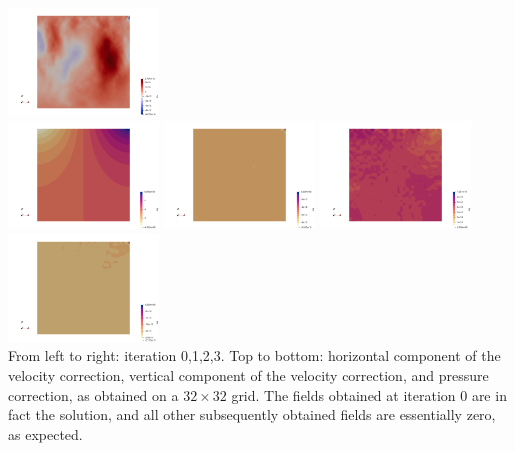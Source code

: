 \begin{center}
\includegraphics[width=4cm]{python_codes/fieldstone_87/results/experiment_00/dv_03}\\
\includegraphics[width=4cm]{python_codes/fieldstone_87/results/experiment_00/dp_00}
\includegraphics[width=4cm]{python_codes/fieldstone_87/results/experiment_00/dp_01}
\includegraphics[width=4cm]{python_codes/fieldstone_87/results/experiment_00/dp_02}
\includegraphics[width=4cm]{python_codes/fieldstone_87/results/experiment_00/dp_03}\\
{\captionfont From left to right: iteration 0,1,2,3. 
Top to bottom: horizontal component of the velocity correction, 
vertical component of the velocity correction, and pressure correction, 
as obtained on a $32\times 32$ grid. The fields obtained at iteration 0 
are in fact the solution, and all other subsequently obtained fields 
are essentially zero, as expected.}
\end{center}

\newpage
